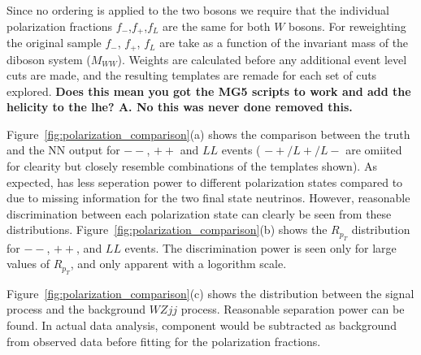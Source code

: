 \normalsize Since no ordering is applied to the two bosons we require
that the individual polarization fractions $f_-$,$f_+$,$f_L$ are the
same for both $W$ bosons.  For reweighting the original sample $f_-$,
$f_+$, $f_L$ are take as a function of the invariant mass of the
diboson system ($M_{WW}$).  Weights are calculated before any
additional event level cuts are made, and the resulting templates are
remade for each set of cuts explored.  
{\bf Does this mean you got the
  MG5 scripts to work and add the helicity to the lhe? A. No this was never done removed this.}
 
Figure~\ref{fig:polarization_comparison}(a) shows the comparison between the truth \cts and 
the NN output \ctsNN for $--$, $++$ and $LL$ events ( $-+/L+/L-$ are omiited for clearity but closely resemble combinations of the templates shown). As expected, \ctsNN has less seperation 
power to different polarization states compared to \cts due to missing information for the two final state neutrinos. 
However, reasonable discrimination between each polarization state can clearly be seen from these distributions. 
Figure~\ref{fig:polarization_comparison}(b) shows the $R_{p_T}$ distribution for $--$, $++$, and $LL$ events. 
The discrimination power is seen only for large values of $R_{p_T}$, and only apparent with a logorithm scale.

Figure~\ref{fig:polarization_comparison}(c) shows the \ctsNN distribution between the signal \ssWW process and the background $WZjj$ process. 
Reasonable separation power can be found. In actual data analysis, component would be subtracted as background from observed data before fitting for the polarization fractions. 

